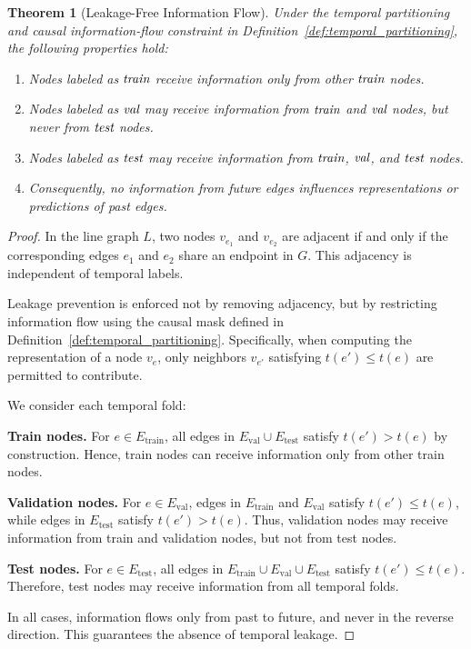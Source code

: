 \documentclass[pdflatex,sn-mathphys-num]{sn-jnl}%
\theoremstyle{thmstyleone}%
\newtheorem{theorem}{Theorem}%
\theoremstyle{thmstyletwo}%
\theoremstyle{thmstylethree}%
\theoremstyle{plain} %
\theoremstyle{definition} %
\theoremstyle{remark} %
\theoremstyle{plain} %
\begin{document}
\begin{theorem}[Leakage-Free Information Flow]
\label{thm:leakage_free}
Under the temporal partitioning and causal information-flow constraint in
Definition~\ref{def:temporal_partitioning}, the following properties hold:

\begin{enumerate}
    \item Nodes labeled as $\emph{train}$ receive information only from other
    $\emph{train}$ nodes.

    \item Nodes labeled as $\emph{val}$ may receive information from
    $\emph{train}$ and $\emph{val}$ nodes, but never from $\emph{test}$ nodes.

    \item Nodes labeled as $\emph{test}$ may receive information from
    $\emph{train}$, $\emph{val}$, and $\emph{test}$ nodes.

    \item Consequently, no information from future edges influences
    representations or predictions of past edges.
\end{enumerate}
\end{theorem}


\begin{proof}
In the line graph $L$, two nodes $v_{e_1}$ and $v_{e_2}$ are adjacent if and only
if the corresponding edges $e_1$ and $e_2$ share an endpoint in $G$.
This adjacency is independent of temporal labels.

Leakage prevention is enforced not by removing adjacency, but by restricting
information flow using the causal mask defined in
Definition~\ref{def:temporal_partitioning}.
Specifically, when computing the representation of a node $v_e$, only neighbors
$v_{e'}$ satisfying $t(e') \le t(e)$ are permitted to contribute.

We consider each temporal fold:

\textbf{Train nodes.}
For $e \in E_{\text{train}}$, all edges in $E_{\text{val}} \cup E_{\text{test}}$
satisfy $t(e') > t(e)$ by construction.
Hence, train nodes can receive information only from other train nodes.

\textbf{Validation nodes.}
For $e \in E_{\text{val}}$, edges in $E_{\text{train}}$ and $E_{\text{val}}$
satisfy $t(e') \le t(e)$, while edges in $E_{\text{test}}$ satisfy
$t(e') > t(e)$.
Thus, validation nodes may receive information from train and validation nodes,
but not from test nodes.

\textbf{Test nodes.}
For $e \in E_{\text{test}}$, all edges in
$E_{\text{train}} \cup E_{\text{val}} \cup E_{\text{test}}$
satisfy $t(e') \le t(e)$.
Therefore, test nodes may receive information from all temporal folds.

In all cases, information flows only from past to future, and never in the
reverse direction. This guarantees the absence of temporal leakage.
\end{proof}
\end{document}

